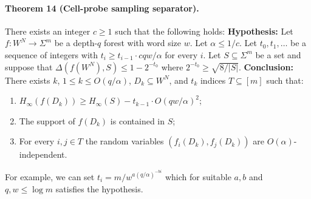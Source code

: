 \paragraph{Theorem 14 (Cell-probe sampling separator).}
There exists an integer $c\geq1$ such that the following holds:
\textbf{Hypothesis:} Let $f:W^N\to\Sigma^m$ be a depth-$q$ forest with word size $w$. Let $\alpha\leq1/c$. Let $t_0,t_1,\ldots$ be a sequence of integers with $t_i\geq t_{i-1}\cdot cqw/\alpha$ for every $i$. Let $S\subseteq\Sigma^m$ be a set and suppose that $\Delta(f(W^N),S)\leq1-2^{-t_0}$ where $2^{-t_0}\geq\sqrt{8/|S|}$.
\textbf{Conclusion:} There exists $k$, $1\leq k\leq O(q/\alpha)$, $D_k\subseteq W^N$, and $t_k$ indices $T\subseteq[m]$ such that:
\begin{enumerate}
\item[(0)] $H_\infty(f(D_k))\geq H_\infty(S)-t_{k-1}\cdot O(qw/\alpha)^2$;
\item[(1)] The support of $f(D_k)$ is contained in $S$;
\item[(2)] For every $i,j\in T$ the random variables $(f_i(D_k),f_j(D_k))$ are $O(\alpha)$-independent.
\end{enumerate}
For example, we can set $t_i=m/w^{a(q/\alpha)^{-bi}}$ which for suitable $a,b$ and $q,w\leq\log m$ satisfies the hypothesis.
